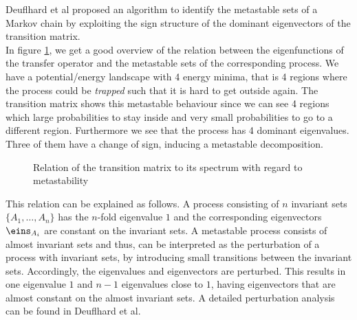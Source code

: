 {{Deuflhard et al\cite{deuflhard2000identification} proposed an algorithm to identify the metastable sets of a Markov chain by exploiting the sign structure of the dominant eigenvectors of the transition matrix.
\\

In figure \ref{fig:spectrum}, we get a good overview of the relation between the eigenfunctions of the transfer operator and the metastable sets of the corresponding process. We have a potential/energy landscape with 4 energy minima, that is 4 regions where the process could be \textit{trapped} such that it is hard to get outside again. The transition matrix  shows this metastable behaviour since we can see 4 regions which large probabilities to stay inside and very small probabilities to go to a different region.
Furthermore we see that the process has 4 dominant eigenvalues. Three of them have a change of sign, inducing a metastable decomposition.
\newpage


\begin{figure}[!ht]
	\label{fig:spectrum}
	\centering
	\caption{Relation of the transition matrix to its spectrum with regard to metastability}
\end{figure}



This relation can be explained as follows.
A process consisting of $n$ invariant sets $\{A_1,\dots,A_n\}$ has the $n$-fold eigenvalue $1$ and the corresponding eigenvectors $\eins_{A_i}$ are constant on the invariant sets.
A metastable process consists of almost invariant sets and thus, can be interpreted as the perturbation of a process with invariant sets, by introducing small transitions between the invariant sets. Accordingly, the eigenvalues and eigenvectors are perturbed. This results in one eigenvalue $1$ and $n-1$ eigenvalues close to $1$, having eigenvectors that are almost constant on the almost invariant sets.
A detailed perturbation analysis can be found in Deuflhard et al\cite{deuflhard2000identification}.

}}
